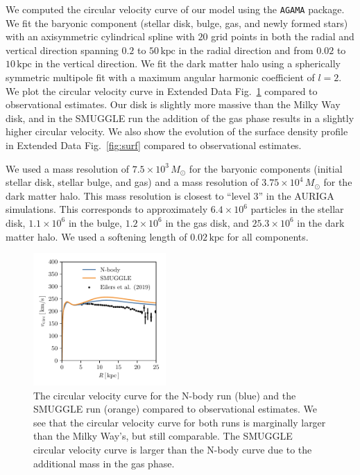 \documentclass{natureprintstyle}
\begin{document}
We computed the circular velocity curve of our model using the \texttt{AGAMA}
package.\cite{2019MNRAS.482.1525V} We fit the baryonic component (stellar
disk, bulge, gas, and newly formed stars) with an axisymmetric cylindrical
spline with $20$ grid points in both the radial and vertical direction
spanning $0.2$ to $50\,\textrm{kpc}$ in the radial direction and from $0.02$
to $10\,\textrm{kpc}$ in the vertical direction. We fit the dark matter halo
using a spherically symmetric multipole fit with a maximum angular harmonic
coefficient of $l=2$. We plot the circular velocity curve in Extended Data
Fig.~\ref{fig:vcirc} compared to observational
estimates.\cite{2019ApJ...871..120E} Our disk is slightly more massive than
the Milky Way disk, and in the SMUGGLE run the addition of the gas phase
results in a slightly higher circular velocity. We also show the evolution of
the surface density profile in Extended Data Fig.~\ref{fig:surf} compared to
observational estimates.\cite{2012ARAA..50..531K}

We used a mass resolution of $7.5\times10^3\,M_{\odot}$ for the baryonic
components (initial stellar disk, stellar bulge, and gas) and a mass
resolution of $3.75\times10^4\,M_{\odot}$ for the dark matter halo. This mass
resolution is closest to ``level 3'' in the AURIGA
simulations.\cite{2017MNRAS.467..179G} This corresponds to approximately
$6.4\times10^6$ particles in the stellar disk, $1.1\times10^6$ in the bulge,
$1.2\times10^6$ in the gas disk, and $25.3\times10^6$ in the dark matter halo.
We used a softening length of $0.02\,\textrm{kpc}$ for all components.

\begin{figure}[h]%
\centering
\includegraphics[width=0.45\textwidth]{fig/fig-vcirc.pdf}
\caption{The circular velocity curve for the N-body run (blue) and the SMUGGLE
run (orange) compared to observational estimates.\cite{2019ApJ...871..120E} We
see that the circular velocity curve for both runs is marginally larger than
the Milky Way's, but still comparable. The SMUGGLE circular velocity curve is
larger than the N-body curve due to the additional mass in the gas phase.}
\label{fig:vcirc}
\end{figure}
\end{document}

